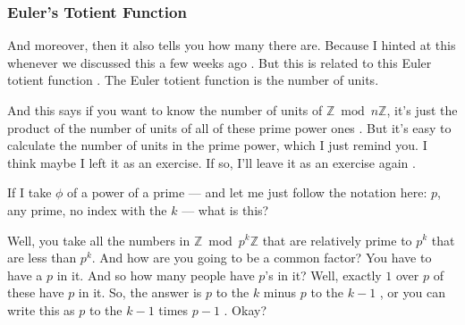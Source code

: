 \subsubsection{Euler's Totient Function}

\begin{speech}[00:18:35 - 00:19:58]
And moreover, then it also tells you how many there are. Because I hinted at this whenever we discussed this a few weeks ago . But this is related to this Euler totient function . The Euler totient function is the number of units.

And this says if you want to know the number of units of $\mathbb{Z} \bmod n\mathbb{Z}$, it's just the product of the number of units of all of these prime power ones . But it's easy to calculate the number of units in the prime power, which I just remind you. I think maybe I left it as an exercise. If so, I'll leave it as an exercise again .

If I take $\phi$ of a power of a prime  --- and let me just follow the notation here: $p$, any prime, no index with the $k$ --- what is this?

Well, you take all the numbers in $\mathbb{Z} \bmod p^k\mathbb{Z}$ that are relatively prime to $p^k$ that are less than $p^k$. And how are you going to be a common factor? You have to have a $p$ in it. And so how many people have $p$'s in it? Well, exactly $1$ over $p$ of these have $p$ in it. So, the answer is $p$ to the $k$ minus $p$ to the $k - 1$ , or you can write this as $p$ to the $k - 1$ times $p - 1$ . Okay?
\end{speech}

